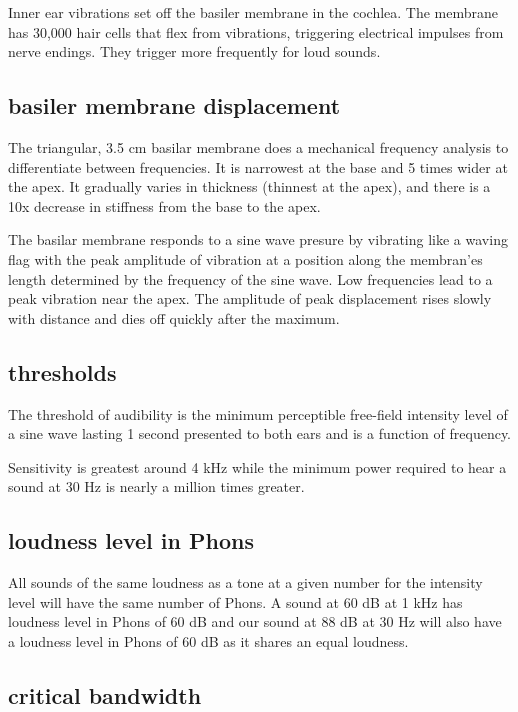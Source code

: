 \documentclass[10pt, a4paper, twocolumn]{article}
\begin{document}
Inner ear vibrations set off the basiler membrane in the cochlea. The membrane has 30,000 hair cells that flex from vibrations, triggering electrical impulses from nerve endings. They trigger more frequently for loud sounds.

\subsection{basiler membrane displacement}

The triangular, 3.5 cm basilar membrane does a mechanical frequency analysis to differentiate between frequencies. It is narrowest at the base and 5 times wider at the apex. It gradually varies in thickness (thinnest at the apex), and there is a 10x decrease in stiffness from the base to the apex. 

The basilar membrane responds to a sine wave presure by vibrating like a waving flag with the peak amplitude of vibration at a position along the membran'es length determined by the frequency of the sine wave. Low frequencies lead to a peak vibration near the apex. The amplitude of peak displacement rises slowly with distance and dies off quickly after the maximum.

\subsection{thresholds}

The threshold of audibility is the minimum perceptible free-field intensity level of a sine wave lasting 1 second presented to both ears and is a function of frequency.

Sensitivity is greatest around 4 kHz while the minimum power required to hear a sound at 30 Hz is nearly a million times greater.

\subsection{loudness level in Phons}

All sounds of the same loudness as a tone at a given number for the intensity level will have the same number of Phons. A sound at 60 dB at 1 kHz has loudness level in Phons of 60 dB and our sound at 88 dB at 30 Hz will also have a loudness level in Phons of 60 dB as it shares an equal loudness.

\subsection{critical bandwidth}
\end{document}
